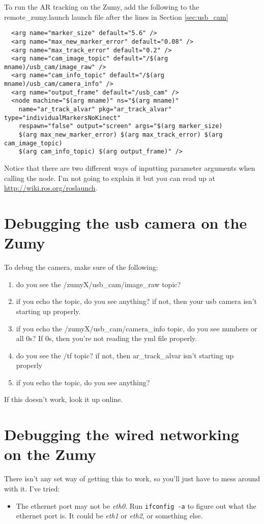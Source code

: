 \documentclass[10pt]{article}
\begin{document}
To run the AR tracking on the Zumy, add the following to the remote\_zumy.launch launch file after the lines in Section \ref{sec:usb_cam}
  \begin{verbatim}
  <arg name="marker_size" default="5.6" />
  <arg name="max_new_marker_error" default="0.08" />
  <arg name="max_track_error" default="0.2" />
  <arg name="cam_image_topic" default="/$(arg mname)/usb_cam/image_raw" />
  <arg name="cam_info_topic" default="/$(arg mname)/usb_cam/camera_info" />
  <arg name="output_frame" default="/usb_cam" />
  <node machine="$(arg mname)" ns="$(arg mname)"
    name="ar_track_alvar" pkg="ar_track_alvar" type="individualMarkersNoKinect" 
    respawn="false" output="screen" args="$(arg marker_size) 
    $(arg max_new_marker_error) $(arg max_track_error) $(arg cam_image_topic) 
    $(arg cam_info_topic) $(arg output_frame)" />
  \end{verbatim}
  
Notice that there are two different ways of inputting parameter arguments when calling the node.
I'm not going to explain it but you can read up at \url{http://wiki.ros.org/roslaunch}.

\section{Debugging the usb camera on the Zumy}

To debug the camera, make sure of the following:
\begin{enumerate}
\item do you see the /zumyX/usb\_cam/image\_raw topic?
\item if you echo the topic, do you see anything?  if not, then your usb camera isn't starting up properly.
\item if you echo the /zumyX/usb\_cam/camera\_info topic, do you see numbers or all 0s?  If 0s, then you're not reading the yml file properly.
\item do you see the /tf topic? if not, then ar\_track\_alvar isn't starting up properly
\item if you echo the topic, do you see anything?
\end{enumerate}
If this doesn't work, look it up online.  

\section{Debugging the wired networking on the Zumy}

There isn't any set way of getting this to work, so you'll just have to mess around with it.
I've tried:
\begin{itemize}
\item The ethernet port may not be \textit{eth0}.  Run \verb=ifconfig -a= to figure out what the ethernet port is.  It could be \textit{eth1} or \textit{eth2}, or something else.
\end{itemize}
\end{document}
